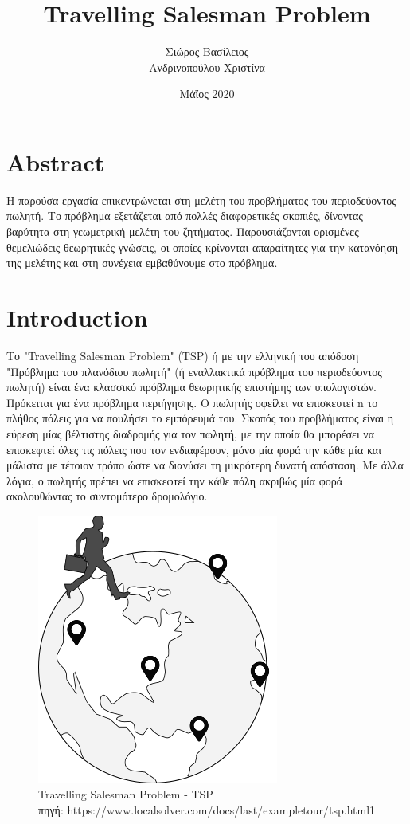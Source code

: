 \documentclass[oneside,12pt]{book}
\title{\huge Travelling Salesman Problem}
\author{Σιώρος Βασίλειος\\Ανδρινοπούλου Χριστίνα}
\date{Μάϊος 2020}
\newenvironment{matlab}
	{\begin{figure}[hp]\centering\captionsetup{justification=centering}}
	{\end{figure}}
\theoremstyle{definition}
\begin{document}
\maketitle
{}
\pagebreak
\tableofcontents

\chapter{Abstract}

Η παρούσα εργασία επικεντρώνεται στη μελέτη του προβλήματος του περιοδεύοντος πωλητή. Το πρόβλημα εξετάζεται από πολλές διαφορετικές σκοπιές, δίνοντας βαρύτητα στη γεωμετρική μελέτη του ζητήματος. Παρουσιάζονται ορισμένες θεμελιώδεις θεωρητικές γνώσεις, οι οποίες κρίνονται απαραίτητες για την κατανόηση της μελέτης και στη συνέχεια εμβαθύνουμε στο πρόβλημα.

\chapter{Introduction}

Το "Travelling Salesman Problem" (TSP) ή με την ελληνική του απόδοση "Πρόβλημα του πλανόδιου πωλητή" (ή εναλλακτικά πρόβλημα του περιοδεύοντος πωλητή) είναι ένα κλασσικό πρόβλημα θεωρητικής επιστήμης των  υπολογιστών. Πρόκειται για ένα πρόβλημα περιήγησης. Ο πωλητής οφείλει να επισκευτεί n το πλήθος πόλεις για να πουλήσει το εμπόρευμά του. Σκοπός του προβλήματος είναι η εύρεση μίας βέλτιστης διαδρομής για τον πωλητή, με την οποία θα μπορέσει να επισκεφτεί όλες τις πόλεις που τον ενδιαφέρουν, μόνο μία φορά την κάθε μία και μάλιστα με τέτοιον τρόπο ώστε να διανύσει τη μικρότερη δυνατή απόσταση. Με άλλα λόγια, ο πωλητής πρέπει να επισκεφτεί την κάθε πόλη ακριβώς μία φορά ακολουθώντας το συντομότερο δρομολόγιο. \\

\begin{matlab}
	\includegraphics[scale=0.8]{images/tsp.png}
	\caption{Travelling Salesman Problem - TSP \\ πηγή: https://www.localsolver.com/docs/last/exampletour/tsp.html1}
\end{matlab}
\end{document}
